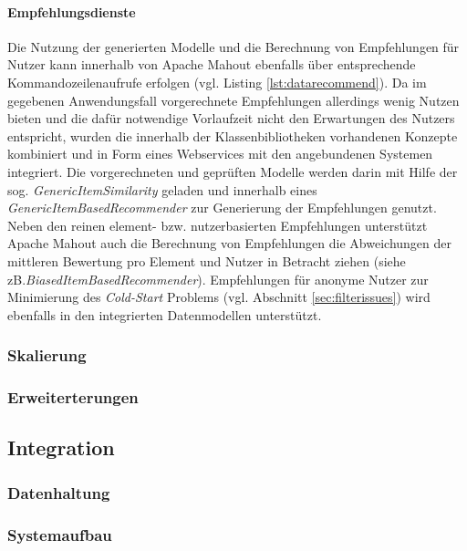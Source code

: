 

\paragraph{Empfehlungsdienste} Die Nutzung der generierten Modelle und die Berechnung von Empfehlungen für Nutzer kann innerhalb von Apache Mahout ebenfalls über entsprechende Kommandozeilenaufrufe erfolgen (vgl. Listing \ref{lst:datarecommend}). Da im gegebenen Anwendungsfall vorgerechnete Empfehlungen allerdings wenig Nutzen bieten und die dafür notwendige Vorlaufzeit nicht den Erwartungen des Nutzers entspricht, wurden die innerhalb der Klassenbibliotheken vorhandenen Konzepte kombiniert und in Form eines Webservices mit den angebundenen Systemen integriert. Die vorgerechneten und geprüften Modelle werden darin mit Hilfe der sog. \textit{GenericItemSimilarity} geladen und innerhalb eines \textit{GenericItemBasedRecommender} zur Generierung der Empfehlungen genutzt. Neben den reinen element- bzw. nutzerbasierten Empfehlungen unterstützt Apache Mahout auch die Berechnung von Empfehlungen die Abweichungen der mittleren Bewertung pro Element und Nutzer in Betracht ziehen (siehe zB.\textit{BiasedItemBasedRecommender}). Empfehlungen für anonyme Nutzer zur Minimierung des \textit{Cold-Start} Problems (vgl. Abschnitt \ref{sec:filterissues}) wird ebenfalls in den integrierten Datenmodellen unterstützt. 

 

\subsubsection{Skalierung}
\subsubsection{Erweiterterungen}


\subsection{Integration}
\subsubsection{Datenhaltung}
\subsubsection{Systemaufbau}
